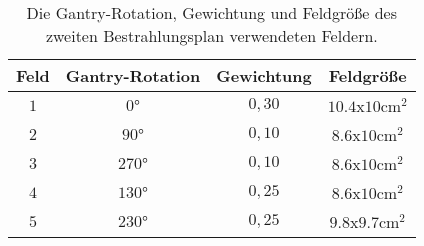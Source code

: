 \begin{table}
	\centering
	\caption{Die Gantry-Rotation, Gewichtung und Feldgröße des zweiten Bestrahlungsplan verwendeten Feldern.}
	\label{tab:Felder2}
	\begin{tabular}{c c c c}
		\toprule
		Feld & Gantry-Rotation & Gewichtung & Feldgröße\\
		\midrule
		$1$ & $0°$ & $0,30$   & $\num{10.4}$x$\num{10} \si{\centi\meter\squared}$ \\
		$2$ & $90°$ & $0,10$  & $\num{8.6}$x$\num{10}\si{\centi\meter\squared}$ \\
		$3$ & $270°$ & $0,10$ & $\num{8.6}$x$\num{10}\si{\centi\meter\squared}$ \\
		$4$ & $130°$ & $0,25$ & $\num{8.6}$x$\num{10}\si{\centi\meter\squared}$ \\
		$5$ & $230°$ & $0,25$ & $\num{9.8}$x$\num{9.7} \si{\centi\meter\squared}$ \\
		\bottomrule
	\end{tabular}
\end{table}
